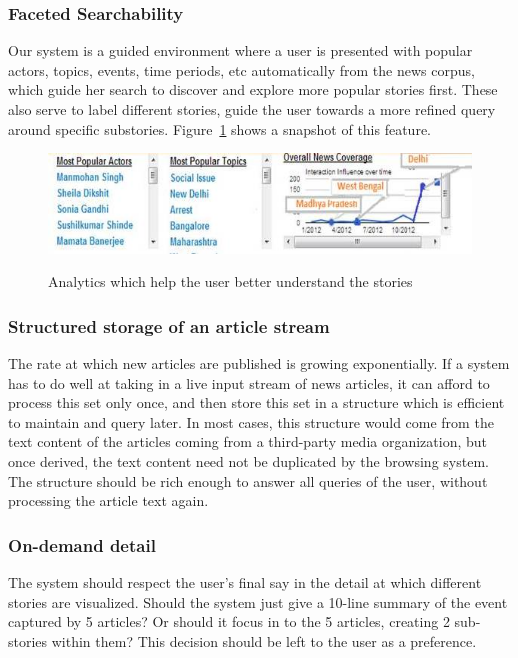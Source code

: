 \subsubsection{Faceted Searchability}
Our system is a guided environment where a user is presented with popular actors, topics, events, time periods, etc automatically from the 
news corpus, which guide her search to discover and explore more popular stories first. These also serve to label different stories, guide the
user towards a more refined query around specific substories. Figure~\ref{fig:faceted-search} shows a snapshot of this feature.
\begin{figure}[ht]
\begin{center}
\caption{Analytics which help the user better understand the stories}
\includegraphics[scale=0.34]{figures/faceted.png}
\label{fig:faceted-search}
\end{center}
\end{figure}

\subsubsection{Structured storage of an article stream}
The rate at which new articles are published is growing exponentially. If a system
has to do well at taking in a live input stream of news articles, it can afford to process this set only once, and then store this set in a structure
which is efficient to maintain and query later. In most cases, this structure would come from the text content of the articles coming from a third-party media organization, 
but once derived, the text content need not be duplicated by the browsing system. The structure should be rich enough to answer all queries of the user, without
processing the article text again.
\subsubsection{On-demand detail}
The system should respect the user's final say in the detail at which different stories are visualized. Should the system
just give a 10-line summary of the event captured by 5 articles? Or should it focus in to the 5 articles, creating 2 sub-stories within them? This decision
should be left to the user as a preference.

